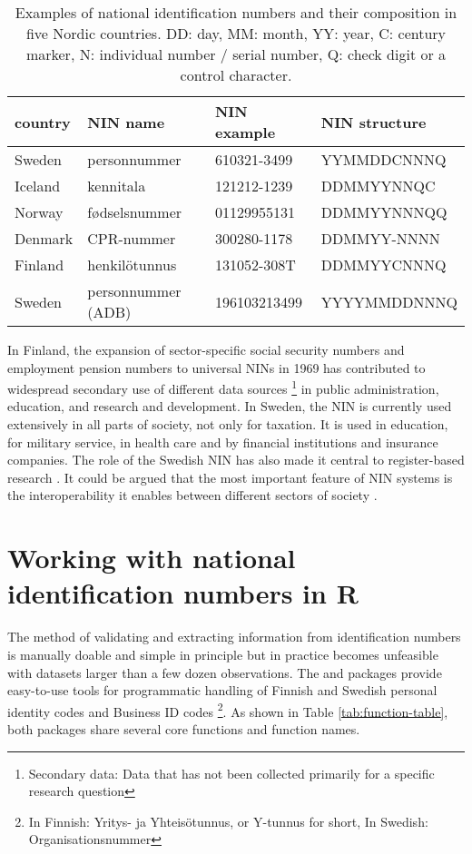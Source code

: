 \begin{table}[!h]
\centering
\caption{\label{tab:nin-table2}Examples of national identification numbers and their composition in five Nordic countries. DD: day, MM: month, YY: year, C: century marker, N: individual number / serial number, Q: check digit or a control character.}
\centering
\begin{tabular}[t]{llll}
\toprule
country & NIN name & NIN example & NIN structure\\
\midrule
Sweden & personnummer & 610321-3499 & YYMMDDCNNNQ\\
Iceland & kennitala & 121212-1239 & DDMMYYNNQC\\
Norway & fødselsnummer & 01129955131 & DDMMYYNNNQQ\\
Denmark & CPR-nummer & 300280-1178 & DDMMYY-NNNN\\
Finland & henkilötunnus & 131052-308T & DDMMYYCNNNQ\\
\addlinespace
Sweden & personnummer (ADB) & 196103213499 & YYYYMMDDNNNQ\\
\bottomrule
\end{tabular}
\end{table}

In Finland, the expansion of sector-specific social security numbers and employment pension numbers to universal NINs in 1969 has contributed to widespread secondary use of different data sources \footnote{Secondary data: Data that has not been collected primarily for a specific research question} in public administration, education, and research and development. In Sweden, the NIN is currently used extensively in all parts of society, not only for taxation. It is used in education, for military service, in health care and by financial institutions and insurance companies. The role of the Swedish NIN has also made it central to register-based research \citep{scb2016}. It could be argued that the most important feature of NIN systems is the interoperability it enables between different sectors of society \citep{alastalo2022}.

\section{Working with national identification numbers in R}\label{working-with-national-identification-numbers-in-r}

The method of validating and extracting information from identification numbers is manually doable and simple in principle but in practice becomes unfeasible with datasets larger than a few dozen observations. The  and  packages provide easy-to-use tools for programmatic handling of Finnish and Swedish personal identity codes and Business ID codes \footnote{In Finnish: Yritys- ja Yhteisötunnus, or Y-tunnus for short, In Swedish: Organisationsnummer}. As shown in Table \ref{tab:function-table}, both packages share several core functions and function names.

